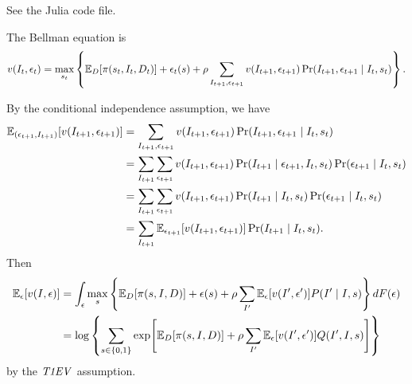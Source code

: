 \documentclass[12pt]{article}
\begin{document}
\begin{sol}[1.1, 1.3, 1.4, 1.9]
    See the Julia code file.
    \solend
\end{sol}
\begin{sol}[1.2]
    The Bellman equation is 
    \begin{equation*}
        v(I_t, \epsilon_t) = \max_{s_t}\brc{\E_D\sbrc{\pi(s_t, I_t, D_t)} + \epsilon_t(s) + \rho\sum_{I_{t+1}, \epsilon_{t+1}}v(I_{t+1}, \epsilon_{t+1})\Pr(I_{t+1}, \epsilon_{t+1}\mid I_t, s_t)}.
    \end{equation*}
    \solend
\end{sol}
\begin{sol}[1.5]
    By the conditional independence assumption, we have 
    \begin{equation*}
        \begin{aligned}
            \E_{(\epsilon_{t+1}, I_{t+1})}\sbrc{v(I_{t+1}, \epsilon_{t+1})}
            &= \sum_{I_{t+1}, \epsilon_{t+1}} v(I_{t+1}, \epsilon_{t+1}) \Pr(I_{t+1}, \epsilon_{t+1}\mid I_t, s_t) \\
            &= \sum_{I_{t+1}}\sum_{\epsilon_{t+1}} v(I_{t+1}, \epsilon_{t+1})\Pr(I_{t+1}\mid \epsilon_{t+1}, I_t, s_t)\Pr(\epsilon_{t+1}\mid I_t, s_t)\\
            &= \sum_{I_{t+1}}\sum_{\epsilon_{t+1}} v(I_{t+1}, \epsilon_{t+1})\Pr(I_{t+1}\mid I_t, s_t)\Pr(\epsilon_{t+1}\mid I_t, s_t)\\
            &= \sum_{I_{t+1}}\E_{\epsilon_{t+1}}\sbrc{v(I_{t+1}, \epsilon_{t+1})}\Pr(I_{t+1}\mid I_t, s_t).
        \end{aligned}
    \end{equation*}
    Then 
    \begin{equation*}
        \begin{aligned}
            \E_\epsilon\sbrc{v(I,\epsilon)} 
            &= \int_\epsilon \max_s\brc{\E_D\sbrc{\pi(s,I,D)} + \epsilon(s) + \rho\sum_{I'}\E_\epsilon\sbrc{v(I',\epsilon')}P(I'\mid I, s)}dF(\epsilon)\\ 
            &= \log\brc{\sum_{s\in\set{0,1}}\exp\sbrc{\E_D\sbrc{\pi(s,I,D)} + \rho\sum_{I'}\E_\epsilon\sbrc{v(I',\epsilon')}Q(I', I, s)}}
        \end{aligned}
    \end{equation*}
    by the $\it{T1EV}$ assumption.
    \solend
\end{sol}
\end{document}
